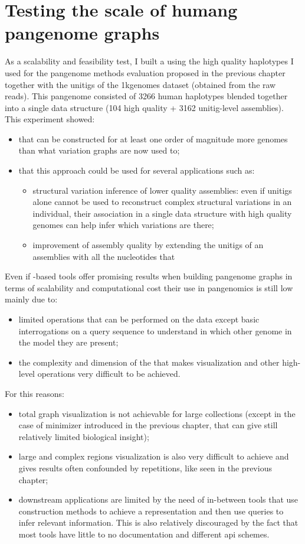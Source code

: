 \section{Testing the scale of humang pangenome graphs}
As a scalability and feasibility test, I built a \ccdbg using the high quality haplotypes I used for the pangenome methods evaluation proposed in the previous chapter together with the unitigs of the 1kgenomes dataset (obtained from the raw reads). This pangenome consisted of 3266 human haplotypes blended together into a single data structure (104 high quality + 3162 unitig-level assemblies). This experiment showed:
\begin{itemize}
	\item that \ccdbgs can be constructed for at least one order of magnitude more genomes than what variation graphs are now used to;
	\item that this approach could be used for several applications such as:
	\begin{itemize}
		\item structural variation inference of lower quality assemblies: even if unitigs alone cannot be used to reconstruct complex structural variations in an individual, their association in a single data structure with high quality genomes can help infer which variations are there;
		\item improvement of assembly quality by extending the unitigs of an assemblies with all the nucleotides that 
	\end{itemize}
\end{itemize}
Even if \dbg-based tools offer promising results when building pangenome graphs in terms of scalability and computational cost their use in pangenomics is still low mainly due to:
\begin{itemize}
	\item limited operations that can be performed on the data except basic \kmer interrogations on a query sequence to understand in which other genome in the model they are present;
	\item the complexity and dimension of the \ccdbgs that makes visualization and other high-level operations very difficult to be achieved.
\end{itemize}
For this reasons:
\begin{itemize}
	\item total graph visualization is not achievable for large collections (except in the case of minimizer \dbgs introduced in the previous chapter, that can give still relatively limited biological insight);
	\item large and complex regions visualization is also very difficult to achieve and gives results often confounded by repetitions, like seen in the previous chapter;
	\item downstream applications are limited by the need of in-between tools that use construction methods to achieve a representation and then use queries to infer relevant information. This is also relatively discouraged by the fact that most tools have little to no documentation and different api schemes.
\end{itemize}



